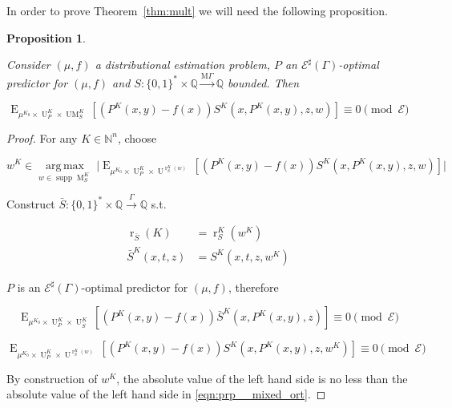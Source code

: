 \documentclass{article}
\numberwithin{equation}{section}
\theoremstyle{definition}
\theoremstyle{plain}
\newtheorem{proposition}{Proposition}[section]
\newcommand{\Bool}{\{0,1\}}
\newcommand{\Words}{{\Bool^*}}
\DeclareMathOperator{\Supp}{supp}
\DeclareMathOperator{\E}{E}
\DeclareMathOperator{\R}{r}
\DeclareMathOperator{\M}{M}
\DeclareMathOperator{\UM}{UM}
\DeclareMathOperator{\Un}{U}
\newcommand{\Argmax}[1]{\underset{#1}{\operatorname{arg\,max}}\,}
\newcommand{\Nats}{\mathbb{N}}
\newcommand{\Rats}{\mathbb{Q}}
\newcommand{\Abs}[1]{\lvert #1 \rvert}
\newcommand{\MGrow}{\mathrm{M}\Gamma}
\newcommand{\Fall}{\mathcal{E}}
\newcommand{\ESG}{\Fall^\sharp(\Gamma)}
\newcommand{\Scheme}{\xrightarrow{\Gamma}}
\newcommand{\MScheme}{\xrightarrow{\MGrow}}
\begin{document}
In order to prove Theorem~\ref{thm:mult} we will need the following proposition.

\begin{samepage}
\begin{proposition}
\label{prp:mixed_ort}

Consider $(\mu,f)$ a distributional estimation problem, $P$ an $\ESG$-optimal predictor for $(\mu,f)$ and $S: \Words \times \Rats \MScheme \Rats$ bounded. Then

\begin{equation}
\label{eqn:prp__mixed_ort}
\E_{\mu^{K_0} \times \Un_P^{K} \times \UM_S^{K}}[(P^{K}(x,y) - f(x))S^{K}(x,P^{K}(x,y),z,w)] \equiv 0 \pmod \Fall
\end{equation}

\end{proposition}
\end{samepage}

\begin{proof}

For any $K \in \Nats^n$, choose 

$$w^{K} \in \Argmax{w \in \Supp \M_S^{K}} \Abs{\E_{\mu^{K_0} \times \Un_P^{K} \times \Un^{\R_S^{K}(w)}}[(P^{K}(x,y) - f(x))S^{K}(x,P^{K}(x,y),z,w)]}$$

Construct $\bar{S}: \Words \times \Rats \Scheme \Rats$ s.t. 

\begin{align*}
\R_{\bar{S}}(K)&=\R_S^{K}(w^{K}) \\
\bar{S}^{K}(x,t,z)&=S^{K}(x,t,z,w^{K})
\end{align*}

$P$ is an $\ESG$-optimal predictor for $(\mu,f)$, therefore

$$\E_{\mu^{K_0} \times \Un_P^{K} \times \Un_{\bar{S}}^{K}}[(P^{K}(x,y) - f(x))\bar{S}^{K}(x,P^{K}(x,y),z)] \equiv 0 \pmod \Fall$$

$$\E_{\mu^{K_0} \times \Un_P^{K} \times \Un^{\R_S^{K}(w)}}[(P^{K}(x,y) - f(x))S^{K}(x,P^{K}(x,y),z,w^{K})] \equiv 0 \pmod \Fall$$

By construction of $w^{K}$, the absolute value of the left hand side is no less than the absolute value of the left hand side in \ref{eqn:prp__mixed_ort}.
\end{proof}
\end{document}
